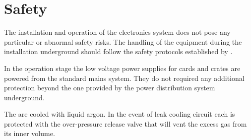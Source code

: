 \section{Safety}
\label{sec:dp-tpcelec-safety}
The installation and operation of the electronics system does not pose any particular or abnormal safety risks. The handling of the equipment during the installation underground should follow the safety protocols established by . 

In the operation stage the low voltage power supplies for  cards and  crates are powered from the standard mains system. They do not required any additional protection beyond the one provided by the power distribution system underground. 

The  are cooled with liquid argon. In the event of leak cooling circuit each  is protected with the over-pressure release valve that will vent the excess gas from its inner volume.  
